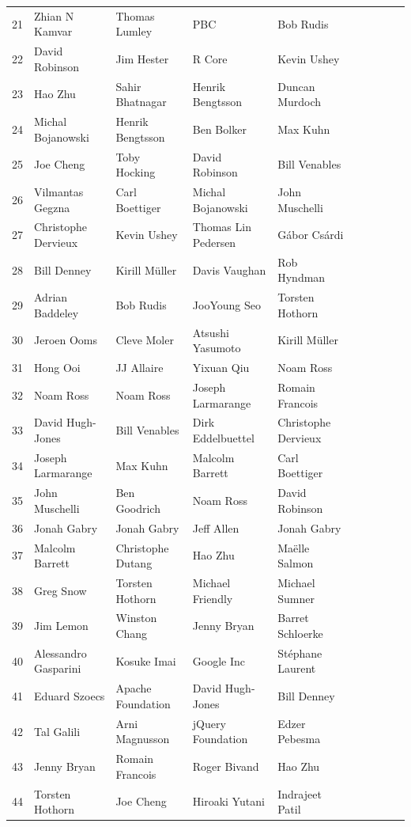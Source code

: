 \begin{table}[h]
\begin{center}
{\begin{tabular}{llllllllll}
 21 & Zhian N Kamvar & Thomas Lumley & PBC & Bob Rudis \\
 22 & David Robinson & Jim Hester & R Core & Kevin Ushey \\
 23 & Hao Zhu & Sahir Bhatnagar & Henrik Bengtsson & Duncan Murdoch \\
 24 & Michal Bojanowski & Henrik Bengtsson & Ben Bolker & Max Kuhn \\
 25 & Joe Cheng & Toby Hocking & David Robinson & Bill Venables \\
 26 & Vilmantas Gegzna & Carl Boettiger & Michal Bojanowski & John Muschelli \\
 27 & Christophe Dervieux & Kevin Ushey & Thomas Lin Pedersen & Gábor Csárdi \\
 28 & Bill Denney & Kirill Müller & Davis Vaughan & Rob Hyndman \\
 29 & Adrian Baddeley & Bob Rudis & JooYoung Seo & Torsten Hothorn \\
 30 & Jeroen Ooms & Cleve Moler & Atsushi Yasumoto & Kirill Müller \\
 31 & Hong Ooi & JJ Allaire & Yixuan Qiu & Noam Ross \\
 32 & Noam Ross & Noam Ross & Joseph Larmarange & Romain Francois \\
 33 & David Hugh-Jones & Bill Venables & Dirk Eddelbuettel & Christophe Dervieux \\
 34 & Joseph Larmarange & Max Kuhn & Malcolm Barrett & Carl Boettiger \\
 35 & John Muschelli & Ben Goodrich & Noam Ross & David Robinson \\
 36 & Jonah Gabry & Jonah Gabry & Jeff Allen & Jonah Gabry \\
 37 & Malcolm Barrett & Christophe Dutang & Hao Zhu & Maëlle Salmon \\
 38 & Greg Snow & Torsten Hothorn & Michael Friendly & Michael Sumner \\
 39 & Jim Lemon & Winston Chang & Jenny Bryan & Barret Schloerke \\
 40 & Alessandro Gasparini & Kosuke Imai & Google Inc & Stéphane Laurent \\
 41 & Eduard Szoecs & Apache Foundation & David Hugh-Jones & Bill Denney \\
 42 & Tal Galili & Arni Magnusson & jQuery Foundation & Edzer Pebesma \\
 43 & Jenny Bryan & Romain Francois & Roger Bivand & Hao Zhu \\
 44 & Torsten Hothorn & Joe Cheng & Hiroaki Yutani & Indrajeet Patil \\

\end{tabular}}
\end{center}
\end{table}
